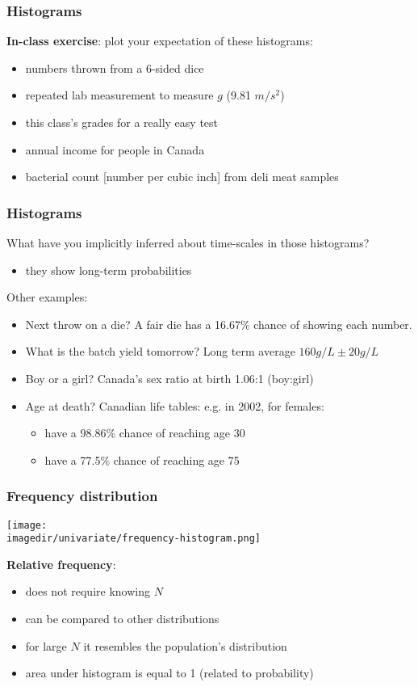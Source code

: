 \begin{frame}\frametitle{Histograms}
	\textbf{In-class exercise}: plot your expectation of these histograms: \vspace{2cm}
	\begin{itemize}
		\item	numbers thrown from a 6-sided dice
		\item	repeated lab measurement to measure $g$ (9.81 $m/s^2$)
		\item	this class's grades for a really easy test
		\item	annual income for people in Canada
		\item	bacterial count [number per cubic inch] from deli meat samples
	\end{itemize}
\end{frame}

\begin{frame}\frametitle{Histograms}
	What have you implicitly inferred about time-scales in those histograms?
	\begin{itemize}
		\item	they show long-term probabilities
	\end{itemize}

	Other examples:
	\begin{itemize}
		\item	Next throw on a die? A fair die has a 16.67\% chance of showing each number.
		\item	What is the batch yield tomorrow? Long term average $160 g/L \pm 20 g/L$
		\item	Boy or a girl? Canada's sex ratio at birth 1.06:1 (boy:girl)
		\item	Age at death? Canadian life tables: e.g. in 2002, for females:
		\begin{itemize}
			\item	have a 98.86\% chance of reaching age 30
			\item	have a 77.5\% chance of reaching age 75
		\end{itemize}
	\end{itemize}
\end{frame}

\begin{frame}\frametitle{Frequency distribution}
	\begin{center}
		\texttt{[image: \\imagedir/univariate/frequency-histogram.png]}
	\end{center}
	\textbf{Relative frequency}:
	\begin{itemize}
		\item	does not require knowing $N$
		\item	can be compared to other distributions
		\item	for large $N$ it resembles the population's distribution
		\item	area under histogram is equal to 1 (related to probability)
	\end{itemize}
\end{frame}

